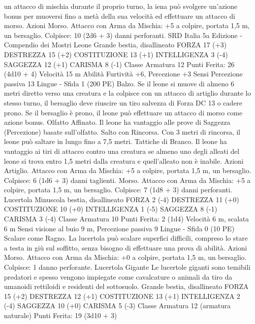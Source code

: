 \begin{multicols}{2}
un attacco di mischia durante il proprio turno, la iena può
svolgere un’azione bonus per muoversi fino a metà della sua
velocità ed effettuare un attacco di morso.
Azioni
Morso. Attacco con Arma da Mischia: +5 a colpire, portata 1,5
m, un bersaglio.
Colpisce: 10 (2d6 + 3) danni perforanti.
SRD Italia 5a Edizione - Compendio dei Mostri
Leone
Grande bestia, disallineato
FORZA 17 (+3)
DESTREZZA 15 (+2)
COSTITUZIONE 13 (+1)
INTELLIGENZA 3 (-4)
SAGGEZZA 12 (+1)
CARISMA 8 (-1)
Classe Armatura 12
\hspace*{0pt}\hfill{Punti Ferita}: 26 (4d10 + 4)
Velocità 15 m
Abilità Furtività +6, Percezione +3
Sensi Percezione passiva 13
Lingue -
Sfida 1 (200 PE)
Balzo. Se il leone si muove di almeno 6 metri diretto verso una
creatura e la colpisce con un attacco di artiglio durante lo stesso
turno, il bersaglio deve riuscire un tiro salvezza di Forza DC 13 o
cadere prono. Se il bersaglio è prono, il leone può effettuare un
attacco di morso come azione bonus.
Olfatto Affinato. Il leone ha vantaggio alle prove di Saggezza
(Percezione) basate sull’olfatto.
Salto con Rincorsa. Con 3 metri di rincorsa, il leone può saltare
in lungo fino a 7,5 metri.
Tattiche di Branco. Il leone ha vantaggio ai tiri di attacco contro
una creatura se almeno uno degli alleati del leone si trova entro
1,5 metri dalla creatura e quell’alleato non è inabile.
Azioni
Artiglio. Attacco con Arma da Mischia: +5 a colpire, portata 1,5
m, un bersaglio.
Colpisce: 6 (1d6 + 3) danni taglienti.
Morso. Attacco con Arma da Mischia: +5 a colpire, portata 1,5
m, un bersaglio.
Colpisce: 7 (1d8 + 3) danni perforanti.
Lucertola
Minuscola bestia, disallineato
FORZA 2 (-4)
DESTREZZA 11 (+0)
COSTITUZIONE 10 (+0)
INTELLIGENZA 1 (-5)
SAGGEZZA 8 (-1)
CARISMA 3 (-4)
Classe Armatura 10
\hspace*{0pt}\hfill{Punti Ferita}: 2 (1d4)
Velocità 6 m, scalata 6 m
Sensi visione al buio 9 m, Percezione passiva 9
Lingue -
Sfida 0 (10 PE)
Scalare come Ragno. La lucertola può scalare superfici difficili,
compreso lo stare a testa in giù sul soffitto, senza bisogno di
effettuare una prova di abilità.
Azioni
Morso. Attacco con Arma da Mischia: +0 a colpire, portata 1,5
m, un bersaglio.
Colpisce: 1 danno perforante.
Lucertola Gigante
Le lucertole giganti sono temibili predatori e spesso
vengono impiegate come cavalcature o animali da tiro
da umanoidi rettiloidi e residenti del sottosuolo.
Grande bestia, disallineato
FORZA 15 (+2)
DESTREZZA 12 (+1)
COSTITUZIONE 13 (+1)
INTELLIGENZA 2 (-4)
SAGGEZZA 10 (+0)
CARISMA 5 (-3)
Classe Armatura 12 (armatura naturale)
\hspace*{0pt}\hfill{Punti Ferita}: 19 (3d10 + 3)

\end{multicols}
